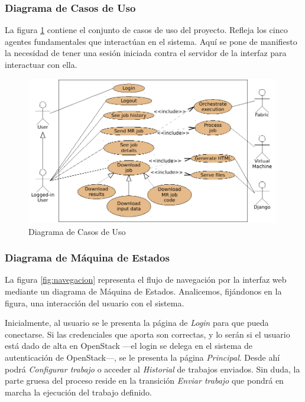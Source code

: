\subsubsection{Diagrama de Casos de Uso}\label{subsubsec:casosuso}
\noindent La figura \ref{fig:casosuso} contiene el conjunto de casos de uso del proyecto. Refleja los cinco agentes fundamentales que interact\'uan en el sistema. Aqu\'i se pone de manifiesto la necesidad de tener una sesi\'on iniciada contra el servidor de la interfaz para interactuar con ella.

\begin{figure}[tbp]
\begin{center}
\includegraphics[width=0.99\textwidth]{imagenes/025.pdf}
 \caption{Diagrama de Casos de Uso}
\label{fig:casosuso}
\end{center}
\end{figure}



\subsubsection{Diagrama de M\'aquina de Estados}\label{subsubsec:navegacion}
\noindent La figura \ref{fig:navegacion} representa el flujo de navegaci\'on por la interfaz web mediante un diagrama de M\'aquina de Estados. Analicemos, fij\'andonos en la figura, una interacci\'on del usuario con el sistema.\newline

Inicialmente, al usuario se le presenta la p\'agina de \emph{Login} para que pueda conectarse. Si las credenciales que aporta son correctas, y lo ser\'an si el usuario est\'a dado de alta en OpenStack ---el login se delega en el sistema de autenticaci\'on de OpenStack---, se le presenta la p\'agina \emph{Principal}. Desde ah\'i podr\'a \emph{Configurar trabajo} o acceder al \emph{Historial} de trabajos en\-via\-dos. Sin duda, la parte gruesa del proceso reside en la transici\'on \emph{Enviar trabajo} que pondr\'a en marcha la ejecuci\'on del trabajo definido.

